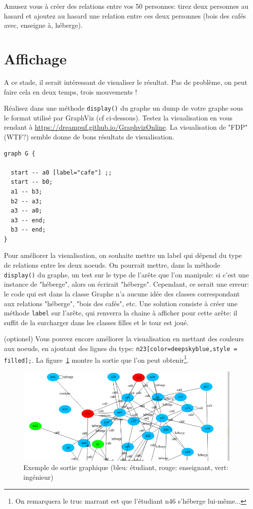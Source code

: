 \documentclass[11pt,TP,2A]{tdtp}
\begin{document}
\quest Amusez vous à créer des relations entre vos 50 personnes: tirez deux personnes au hasard et ajoutez au hasard une relation entre ces deux personnes (bois des cafés avec, enseigne à, héberge).

\section{Affichage}

A ce stade, il serait intéressant de visualiser le résultat. Pas de problème, on peut faire cela en deux temps, trois mouvements !

\quest Réalisez dans une méthode \verb+display()+ du graphe un dump de votre graphe sous le format utilisé par GraphViz (cf ci-dessous). Testez la visualisation en vous rendant à \url{https://dreampuf.github.io/GraphvizOnline}. La visualisation de "FDP" (WTF?) semble donne de bons résultats de visualisation.

\begin{lstlisting}[style=java]
graph G {

  start -- a0 [label="cafe"] ;;
  start -- b0;
  a1 -- b3;
  b2 -- a3;
  a3 -- a0;
  a3 -- end;
  b3 -- end;
}
\end{lstlisting}

\quest Pour améliorer la visualisation, on souhaite mettre un label qui dépend du type de relations entre les deux noeuds. On pourrait mettre, dans la méthode \verb+display()+ du graphe, un test sur le type de l'arête que l'on manipule: si c'est une instance de "héberge", alors on écrirait "héberge". Cependant, ce serait une erreur: le code qui est dans la classe Graphe n'a aucune idée des classes correspondant aux relations "héberge", "bois des cafés", etc. Une solution consiste à créer une méthode \verb+label+ sur l'arête, qui renverra la chaine à afficher pour cette arête: il suffit de la surcharger dans les classes filles et le tour est joué. 

\quest (optionel) Vous pouvez encore améliorer la visualisation en mettant des couleurs aux noeuds, en ajoutant des lignes du type: \verb+n23[color=deepskyblue,style = filled];+. La figure~\ref{graphique} montre la sortie que l'on peut obtenir\footnote{On remarquera le truc marrant est que l'étudiant n46 s'héberge lui-même...}.


\begin{figure}
\begin{center}
\includegraphics[width=13cm]{graph.png}
\caption{Exemple de sortie graphique (bleu: étudiant, rouge: enseignant, vert: ingénieur)}
\label{graphique}
\end{center}
\end{figure}
\end{document}
